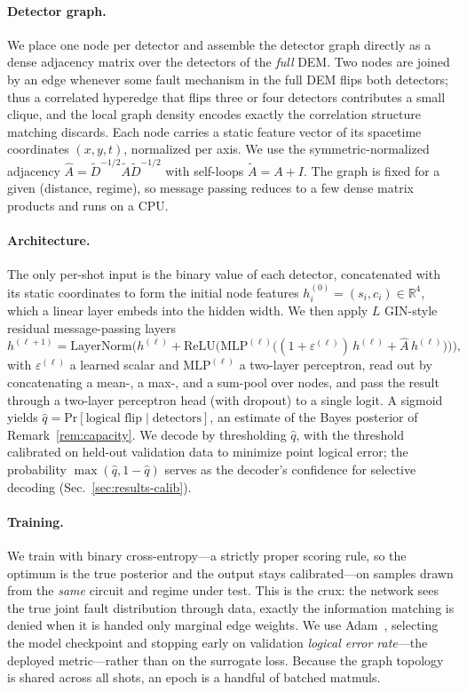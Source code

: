 \documentclass[aps,prxquantum,twocolumn,superscriptaddress,nofootinbib,longbibliography]{revtex4-2}
\newcommand{\R}{\mathbb{R}}
\newcommand{\PR}{\mathrm{Pr}}
\newcommand{\eps}{\varepsilon}
\begin{document}
\paragraph{Detector graph.}
We place one node per detector and assemble the detector graph directly as a
dense adjacency matrix over the detectors of the \emph{full} DEM. Two nodes are
joined by an edge whenever some fault mechanism in the full DEM flips both
detectors; thus a correlated hyperedge that flips three or four detectors
contributes a small clique, and the local graph density encodes exactly the
correlation structure matching discards.
Each node carries a static feature vector of its spacetime coordinates
$(x,y,t)$, normalized per axis. We use the symmetric-normalized adjacency
$\hat A=\tilde D^{-1/2}\tilde A\tilde D^{-1/2}$ with self-loops $\tilde A=A+I$. The
graph is fixed for a given (distance, regime), so message passing reduces to a
few dense matrix products and runs on a CPU.

\paragraph{Architecture.}
The only per-shot input is the binary value of each detector, concatenated with
its static coordinates to form the initial node features
$h^{(0)}_i=(s_i,c_i)\in\R^{4}$, which a linear layer embeds into the hidden
width. We then apply $L$ GIN-style residual message-passing layers
\[
  h^{(\ell+1)} = \mathrm{LayerNorm}\!\Big(h^{(\ell)}+\mathrm{ReLU}\big(
  \mathrm{MLP}^{(\ell)}\big((1+\eps^{(\ell)})\,h^{(\ell)}
  + \hat A\,h^{(\ell)}\big)\big)\Big),
\]
with $\eps^{(\ell)}$ a learned scalar and $\mathrm{MLP}^{(\ell)}$ a two-layer
perceptron, read out by concatenating a mean-, a max-, and a sum-pool over
nodes, and pass the result through a two-layer perceptron head (with dropout) to
a single logit. A sigmoid yields
$\hat q=\PR[\text{logical flip}\mid\text{detectors}]$, an estimate of the Bayes
posterior of Remark~\ref{rem:capacity}. We decode by thresholding $\hat q$, with
the threshold calibrated on held-out validation data to minimize point logical
error; the probability $\max(\hat q,1-\hat q)$ serves as the decoder's confidence
for selective decoding (Sec.~\ref{sec:results-calib}).

\paragraph{Training.}
We train with binary cross-entropy---a strictly proper scoring rule, so the
optimum is the true posterior and the output stays calibrated---on samples drawn
from the \emph{same} circuit and regime under test. This is the crux: the network
sees the true joint fault distribution through data, exactly the information
matching is denied when it is handed only marginal edge weights. We use
Adam~\cite{kingma2015adam}, selecting the model checkpoint and stopping early on
validation \emph{logical error rate}---the deployed metric---rather than on the
surrogate loss. Because the graph topology is shared across all
shots, an epoch is a handful of batched matmuls.
\end{document}
